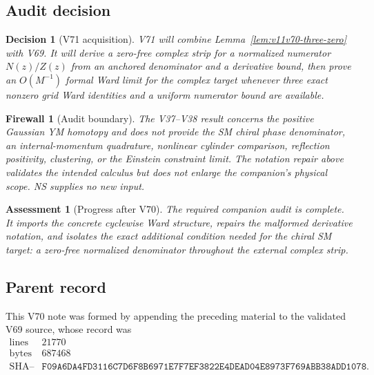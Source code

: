 \documentclass[11pt]{article}
\newtheorem{assessment}[theorem]{Assessment}
\newtheorem{firewall}[theorem]{Firewall}
\newtheorem{decision}[theorem]{Decision}
\begin{document}
\subsection{Audit decision}

\begin{decision}[V71 acquisition]
\label{dec:v11v70-next}
V71 will combine Lemma~\ref{lem:v11v70-three-zero} with V69.  It will
derive a zero-free complex strip for a normalized numerator
\(N(z)/Z(z)\) from an anchored denominator and a derivative bound,
then prove an \(O(M^{-1})\) formal Ward limit for the complex target
whenever three exact nonzero grid Ward identities and a uniform
numerator bound are available.
\end{decision}

\begin{firewall}[Audit boundary]
\label{fire:v11v70-boundary}
The V37--V38 result concerns the positive Gaussian YM homotopy and does
not provide the SM chiral phase denominator, an internal-momentum
quadrature, nonlinear cylinder comparison, reflection positivity,
clustering, or the Einstein constraint limit.  The notation repair
above validates the intended calculus but does not enlarge the
companion's physical scope.  NS supplies no new input.
\end{firewall}

\begin{assessment}[Progress after V70]
\label{ass:v11v70-status}
The required companion audit is complete.  It imports the concrete
cyclewise Ward structure, repairs the malformed derivative notation,
and isolates the exact additional condition needed for the chiral
SM target: a zero-free normalized denominator throughout the external
complex strip.
\end{assessment}

\subsection{Parent record}

This V70 note was formed by appending the preceding material to the
validated V69 source, whose record was
\[
\begin{array}{c|c}
\text{lines}&21770\\
\text{bytes}&687468\\
\text{SHA--256}&
\texttt{F09A6DA4FD3116C7D6F8B6971E7F7EF3822E4DEAD04E8973F769ABB38ADD1078}.
\end{array}                                                     \tag{70.6}
\]
\end{document}
